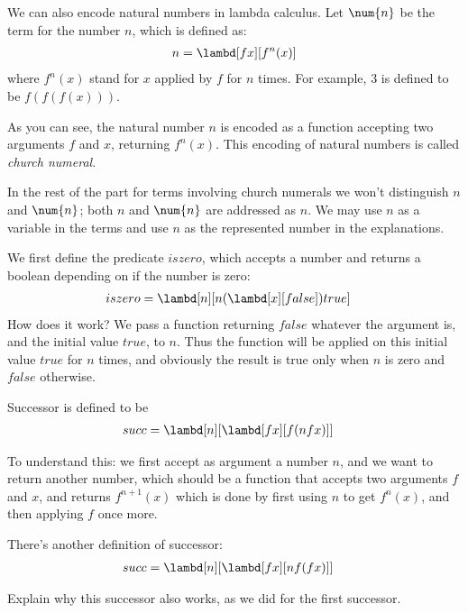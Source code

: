 \documentclass[../../../include/open-logic-section]{subfiles}
\begin{document}

We can also encode natural numbers in lambda calculus. Let
$\num{n}$ be the term for the number $n$, which is defined as:
\begin{align*}
  n &= \lambd[fx][f^n(x)]\\
\end{align*}
where $f^n(x)$ stand for $x$ applied by $f$ for $n$ times. For
example, $\num{3}$ is defined to be $f(f(f(x)))$. 

As you can see, the natural number $n$ is encoded as a function
accepting two arguments $f$ and $x$, returning $f^n(x)$. This encoding
of natural numbers is called \emph{church numeral}.

In the rest
of the part for terms involving church numerals we won't distinguish
$n$ and $\num{n}$; both $n$ and
$\num{n}$ are addressed as $n$. We may use $n$ as a variable in the
terms and use $n$ as the represented number in the explanations.

We first define the predicate $iszero$, which accepts a number and
returns a boolean depending on if the number is zero:
\begin{align*}
  iszero &= \lambd[n][n (\lambd[x][false]) true]
\end{align*}
How does it work? We pass a function returning $false$ whatever the
argument is, and the initial value $true$, to $n$. Thus the function
will be applied on this initial value $true$ for $n$ times, and
obviously the result is true only when $n$ is zero and $false$ otherwise.

Successor is defined to be
\begin{align*}
  {succ} &= \lambd[{n}][\lambd[fx][f ({n} f x)]]
\end{align*}

To understand this: we first accept as argument a number ${n}$, and we want to return another number,
which should be a function that accepts
two arguments $f$ and $x$, and returns $f^{n+1}(x)$
which is done by first using ${n}$ to get $f^n(x)$, and then applying $f$ once more.

There's another definition of successor:
\begin{align*}
  {succ} &= \lambd[{n}][\lambd[fx][{n} f (f x)]]
\end{align*}

\begin{prob}
  Explain why this successor also works, as we did for the first successor.
\end{prob}
\end{document}
